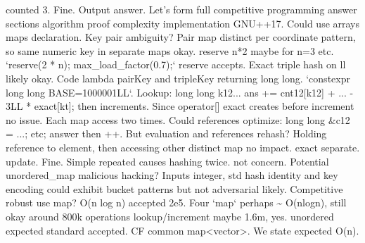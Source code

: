 \begin{decodedreasoningpanel}
counted 3. Fine. Output answer. Let's form full competitive programming answer sections algorithm proof complexity implementation GNU++17. Could use arrays maps declaration. Key pair ambiguity? Pair map distinct per coordinate pattern, so same numeric key in separate maps okay. reserve n*2 maybe for n=3 etc. `reserve(2 * n); max\_load\_factor(0.7);` reserve accepts. Exact triple hash on ll likely okay. Code lambda pairKey and tripleKey returning long long. `constexpr long long BASE=1000001LL`. Lookup: long long k12... ans += cnt12[k12] + ... - 3LL * exact[kt]; then increments. Since operator[] exact creates before increment no issue. Each map access two times. Could references optimize: long long \&c12 = ...; etc; answer then ++. But evaluation and references rehash? Holding reference to element, then accessing other distinct map no impact. exact separate. update. Fine. Simple repeated causes hashing twice. not concern. Potential unordered\_map malicious hacking? Inputs integer, std hash identity and key encoding could exhibit bucket patterns but not adversarial likely. Competitive robust use map? O(n log n) accepted 2e5. Four `map` perhaps \textasciitilde{} O(nlogn), still okay around 800k operations lookup/increment maybe 1.6m, yes. unordered expected standard accepted. CF common map\textless{}vector\textgreater{}. We state expected O(n).
\end{decodedreasoningpanel}
